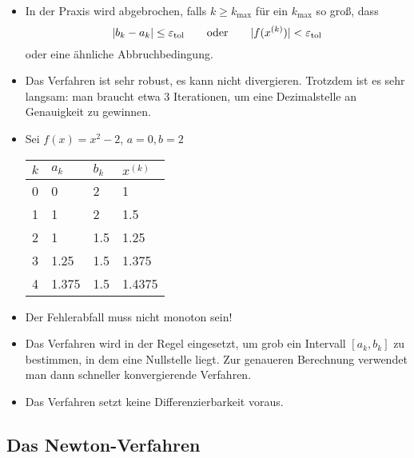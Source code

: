 \documentclass[
]{mycourse}
\begin{document}
\begin{nt*}
	\begin{itemize}
		\item
			In der Praxis wird abgebrochen, falls $k \ge k_{\text{max}}$ für ein $k_{\text{max}}$ so groß, dass
			\[
				|b_k -a_k| \le \varepsilon_{\text{tol}}
				\qquad
				\text{oder}
				\qquad
				|f(x^{(k)})| < \varepsilon_{\text{tol}}
			\]
			oder eine ähnliche Abbruchbedingung.
		\item
			Das Verfahren ist sehr robust, es kann nicht divergieren.
			Trotzdem ist es sehr langsam: man braucht etwa 3 Iterationen, um eine Dezimalstelle an Genauigkeit zu gewinnen.
		\item
			Sei $f(x) = x^2 - 2$, $a=0, b=2$
			\begin{table}[H]
				\centering
				\begin{tabular}{c|l|l|l}
					$k$ & $a_k$ & $b_k$ & $x^{(k)}$ \\ \hline
					0 & 0 & 2 & 1 \\
					1 & 1 & 2 & 1.5 \\
					2 & 1 & 1.5 & 1.25 \\
					3 & 1.25 & 1.5 & 1.375 \\
					4 & 1.375 & 1.5 & 1.4375 
				\end{tabular}
			\end{table}
		\item
			Der Fehlerabfall muss nicht monoton sein!
		\item
			Das Verfahren wird in der Regel eingesetzt, um grob ein Intervall $[a_k,b_k]$ zu bestimmen, in dem eine Nullstelle liegt.
			Zur genaueren Berechnung verwendet man dann schneller konvergierende Verfahren.
		\item
			Das Verfahren setzt keine Differenzierbarkeit voraus.
	\end{itemize}
\end{nt*}

\subsection{Das Newton-Verfahren}
\end{document}

